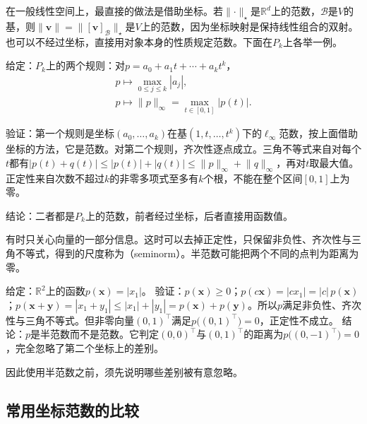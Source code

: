 在一般线性空间上，最直接的做法是借助坐标。若$\lVert\cdot\rVert_\star$是$\mathbb R^d$上的范数，$\mathcal B$是$V$的基，则$\lVert\bm v\rVert=\lVert[\bm v]_{\mathcal B}\rVert_\star$是$V$上的范数，因为坐标映射是保持线性组合的双射。也可以不经过坐标，直接用对象本身的性质规定范数。下面在$P_k$上各举一例。
\begin{example}[多项式空间上的两个范数]
\label{ex:ls-polynomial-norms}
给定：$P_k$上的两个规则：对$p=a_0+a_1t+\cdots+a_kt^k$，
\[
\begin{gathered}
p\mapsto\max_{0\leq j\leq k}|a_j|,\\
p\mapsto\lVert p\rVert_\infty=\max_{t\in[0,1]}|p(t)| .
\end{gathered}
\]

验证：第一个规则是坐标$(a_0,\ldots,a_k)$在基$(1,t,\ldots,t^k)$下的$\ell_\infty$范数，按上面借助坐标的方法，它是范数。对第二个规则，齐次性逐点成立。三角不等式来自对每个$t$都有$|p(t)+q(t)|\leq|p(t)|+|q(t)|\leq\lVert p\rVert_\infty+\lVert q\rVert_\infty$，再对$t$取最大值。正定性来自次数不超过$k$的非零多项式至多有$k$个根，不能在整个区间$[0,1]$上为零。

结论：二者都是$P_k$上的范数，前者经过坐标，后者直接用函数值。
\end{example}

有时只关心向量的一部分信息。这时可以去掉正定性，只保留非负性、齐次性与三角不等式，得到的尺度称为（seminorm）。半范数可能把两个不同的点判为距离为零。
\begin{example}[只看第一个坐标的半范数]
\label{ex:ls-seminorm-first-coordinate}
给定：$\mathbb R^2$上的函数$p(\bm x)=|x_1|$。
验证：$p(\bm x)\geq0$；$p(c\bm x)=|cx_1|=|c|\,p(\bm x)$；$p(\bm x+\bm y)=|x_1+y_1|\leq|x_1|+|y_1|=p(\bm x)+p(\bm y)$。所以$p$满足非负性、齐次性与三角不等式。但非零向量$(0,1)^\top$满足$p\bigl((0,1)^\top\bigr)=0$，正定性不成立。
结论：$p$是半范数而不是范数。它判定$(0,0)^\top$与$(0,1)^\top$的距离为$p\bigl((0,-1)^\top\bigr)=0$，完全忽略了第二个坐标上的差别。
\end{example}
因此使用半范数之前，须先说明哪些差别被有意忽略。

\subsection{常用坐标范数的比较}
\label{sec:ls-error-scale-comparison}

